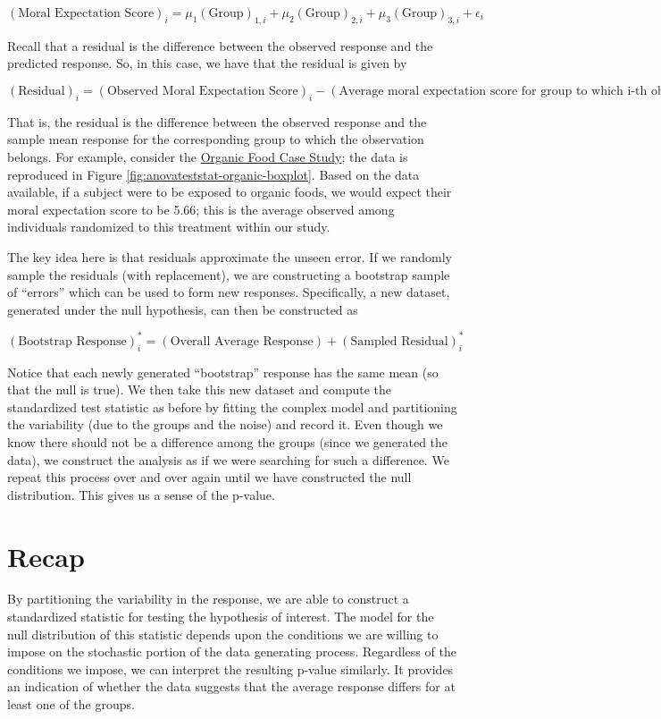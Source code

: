\documentclass[]{book}
\theoremstyle{plain}
\theoremstyle{mydefn}
\theoremstyle{myexmpl}
\theoremstyle{remark}
\begin{document}
\[(\text{Moral Expectation Score})_i = \mu_1 (\text{Group})_{1,i} + \mu_2 (\text{Group})_{2,i} + \mu_3 (\text{Group})_{3,i} + \epsilon_i\]

Recall that a residual is the difference between the observed response
and the predicted response. So, in this case, we have that the residual
is given by

\[(\text{Residual})_i = (\text{Observed Moral Expectation Score})_i - (\text{Average moral expectation score for group to which i-th observation belongs})\]

That is, the residual is the difference between the observed response
and the sample mean response for the corresponding group to which the
observation belongs. For example, consider the
\protect\hyperlink{CaseOrganic}{Organic Food Case Study}; the data is
reproduced in Figure \ref{fig:anovateststat-organic-boxplot}. Based on
the data available, if a subject were to be exposed to organic foods, we
would expect their moral expectation score to be 5.66; this is the
average observed among individuals randomized to this treatment within
our study.

The key idea here is that residuals approximate the unseen error. If we
randomly sample the residuals (with replacement), we are constructing a
bootstrap sample of ``errors'' which can be used to form new responses.
Specifically, a new dataset, generated under the null hypothesis, can
then be constructed as

\[
(\text{Bootstrap Response})_i^* = (\text{Overall Average Response}) + (\text{Sampled Residual})_i^*
\]

Notice that each newly generated ``bootstrap'' response has the same
mean (so that the null is true). We then take this new dataset and
compute the standardized test statistic as before by fitting the complex
model and partitioning the variability (due to the groups and the noise)
and record it. Even though we know there should not be a difference
among the groups (since we generated the data), we construct the
analysis as if we were searching for such a difference. We repeat this
process over and over again until we have constructed the null
distribution. This gives us a sense of the p-value.

\section{Recap}\label{recap-2}

By partitioning the variability in the response, we are able to
construct a standardized statistic for testing the hypothesis of
interest. The model for the null distribution of this statistic depends
upon the conditions we are willing to impose on the stochastic portion
of the data generating process. Regardless of the conditions we impose,
we can interpret the resulting p-value similarly. It provides an
indication of whether the data suggests that the average response
differs for at least one of the groups.
\end{document}
